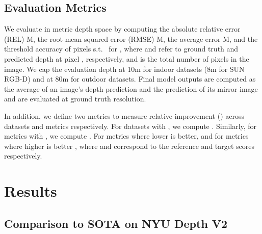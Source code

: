 \documentclass[10pt,twocolumn,letterpaper]{article}
\begin{document}
\subsection{Evaluation Metrics}

We evaluate in metric depth space  by computing the absolute relative error (REL) M, the root mean squared error (RMSE) M, the average  error M, and the threshold accuracy  of pixels s.t.~ for , where  and  refer to ground truth and predicted depth at pixel , respectively, and  is the total number of pixels in the image. We cap the evaluation depth at 10m for indoor datasets (8m for SUN RGB-D) and at 80m for outdoor datasets. 
Final model outputs are computed as the average of an image's depth prediction and the prediction of its mirror image and are evaluated at ground truth resolution.

In addition, we define two metrics to measure relative improvement () across datasets and metrics respectively. For  datasets  with , we compute . Similarly, for  metrics  with , we compute . For metrics where lower is better,  and for metrics where higher is better , where  and  correspond to the reference and target scores respectively.


\section{Results}
\label{sec:results}

\subsection{Comparison to SOTA on NYU Depth V2}
\end{document}
